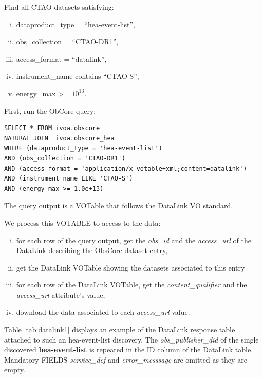 \medskip
\noindent Find all CTAO datasets satisfying:
\begin{enumerate}[(i)]
  \item dataproduct\_type = ``hea-event-list'',
  \item obs\_collection = ``CTAO-DR1'',
  \item access\_format = ``datalink'',
  \item instrument\_name contains ``CTAO-S'',
  \item energy\_max >= $10^{13}$.
\end{enumerate}

First, run the ObCore query:
\begin{verbatim}
SELECT * FROM ivoa.obscore
NATURAL JOIN  ivoa.obscore_hea
WHERE (dataproduct_type = 'hea-event-list')
AND (obs_collection = 'CTAO-DR1')
AND (access_format = 'application/x-votable+xml;content=datalink')
AND (instrument_name LIKE 'CTAO-S')
AND (energy_max >= 1.0e+13)
\end{verbatim}

The query output is a VOTable that follows the DataLink VO standard.

We process this VOTABLE to access to the data:
\begin{enumerate}[(i)]
  \item for each row of the query output, get the {\em obs\_id\/} and the {\em access\_url\/} of the DataLink describing the ObsCore dataset entry,
  \item get the DataLink VOTable showing the datasets associated to this entry
  \item for each row of the DataLink VOTable, get the {\em content\_qualifier\/} and the {\em access\_url\/} attribute's value,
  \item download the data associated to each {\em access\_url\/} value.
\end{enumerate}


Table \ref{tab:datalink1} displays an example of the DataLink response table attached to such an hea-event-list discovery.
The {\em obs\_publisher\_did\/} of the single discovered {\bf hea-event-list} is repeated in the ID column of the DataLink table.
Mandatory FIELDS {\em service\_def\/} and {\em error\_messsage\/} are omitted as they are empty.

